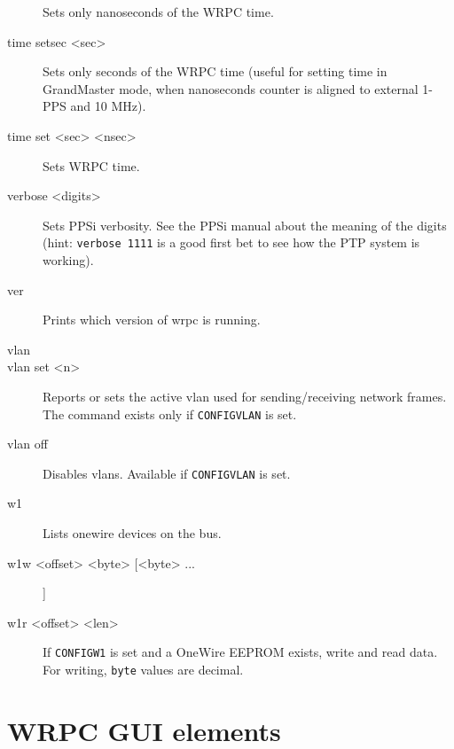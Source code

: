 \documentclass[a4paper, 12pt]{article}
\renewcommand{\_}{\underscore\allowbreak}
\begin{document}
\begin{description}
  Sets only nanoseconds of the WRPC time.

\item[time setsec <sec>] \mbox{}

  Sets only seconds of the WRPC time (useful for setting time in
  GrandMaster mode, when nanoseconds counter is aligned to external
  1-PPS and 10 MHz).

\item[time set <sec> <nsec>] \mbox{}

  Sets WRPC time.

\item[verbose <digits>] \mbox{}

  Sets PPSi verbosity. See the PPSi manual about the meaning of the
  digits (hint: \texttt{verbose 1111} is a good first bet to see how
  the PTP system is working).

\item[ver] \mbox{}

  Prints which version of wrpc is running.

\item[vlan] \mbox{}

\item[vlan set <n>] \mbox{}

  Reports or sets the active vlan used for sending/receiving network
  frames. The command exists only if \texttt{CONFIG\_VLAN} is set.

\item[vlan off] \mbox{}

  Disables vlans. Available if \texttt{CONFIG\_VLAN} is set.

\item[w1] \mbox{}

  Lists onewire devices on the bus.

\item[w1w <offset> <byte> [<byte> ...]] \mbox{}

\item[w1r <offset> <len>] \mbox{}

  If \texttt{CONFIG\_W1} is set and a OneWire EEPROM exists, write and
  read data. For writing, \texttt{byte} values are decimal.

\end{description}


\clearpage
\section{WRPC GUI elements}
\label{WRPC GUI elements}
\end{document}
